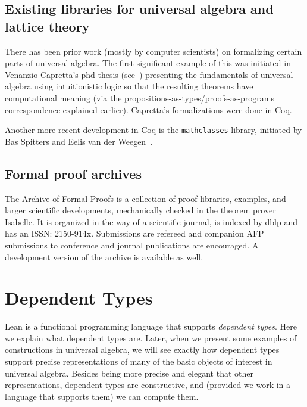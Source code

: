 \documentclass[11pt]{amsart}  %
\begin{document}
\subsection{Existing libraries for universal algebra and lattice theory}
There has been prior work (mostly by computer scientists) on formalizing certain parts of universal algebra. The first significant example of this was initiated in Venanzio Capretta's phd thesis (see~\cite{capretta:1999}) presenting the fundamentals of universal algebra using intuitionistic logic so that the resulting theorems have computational meaning (via the propositions-as-types/proofs-as-programs correspondence explained earlier).  Capretta's formalizations were done in Coq.

Another more recent development in Coq is the {\tt mathclasses} library, initiated by Bas Spitters and Eelis van der Weegen~\cite{MR2678760}. 

\subsection{Formal proof archives}
The \href{https://www.isa-afp.org/}{Archive of Formal Proofs} is a collection of proof libraries, examples, and larger scientific developments, mechanically checked in the theorem prover Isabelle. It is organized in the way of a scientific journal, is indexed by dblp and has an ISSN: 2150-914x.
Submissions are refereed and companion AFP submissions to conference and journal publications are encouraged. A development version of the archive is available as well.









\section{Dependent Types}
Lean is a functional programming language that supports \emph{dependent types}.
Here we explain what dependent types are.  Later, when we present some 
examples of constructions in universal algebra, we will see exactly how dependent types support precise representations of many of the basic objects of interest in universal algebra.
Besides being more precise and elegant that other representations, dependent types are constructive, and (provided we work in a language that supports them) we can compute them.
\end{document}
